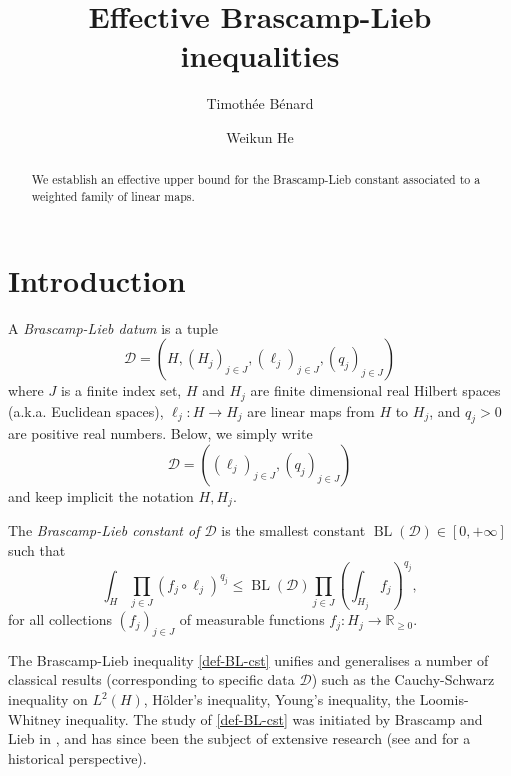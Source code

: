 \documentclass[a4paper,english]{amsart}
\author{Timoth\'ee B\'enard }
\author{Weikun He}
\title{Effective Brascamp-Lieb inequalities}
\theoremstyle{definition}
\newcommand{\R}{\mathbb{R}}
\newcommand{\1}{\mathbbm{1}}
\newcommand{\sD} {{\mathscr D}}
\DeclareMathOperator{\BL}{BL}
\begin{document}
\begin{abstract}
We establish an effective upper bound for the Brascamp-Lieb constant associated to a weighted family of linear maps.
\end{abstract}
\maketitle
\large

\setcounter{tocdepth}{2}    %
\tableofcontents

\section{Introduction} \label{Sec-intro}
A \emph{Brascamp-Lieb datum} is a tuple
$$\sD=(H, (H_{j})_{j\in J}, (\ell_j)_{j \in J}, (q_{j})_{j \in J}) $$
where $J$ is a finite index set, $H$ and $H_{j}$ are finite dimensional real Hilbert spaces (a.k.a. Euclidean spaces), $\ell_{j} : H \to H_{j}$ are
linear maps from $H$ to $H_{j}$, and $q_{j}>0$ are positive real numbers. Below, we simply write
$$\sD=((\ell_j)_{j \in J}, (q_{j})_{j \in J})$$
and keep implicit the notation $H,H_{j}$.


The \emph{Brascamp-Lieb constant of $\sD$} is the smallest constant $\BL(\sD)\in [0, +\infty]$ such that
\begin{equation}\label{def-BL-cst}
\int_{H} \prod_{j \in J} (f_{j}\circ \ell_{j})^{q_{j}} \leq \BL(\sD) \prod_{j \in J} \left(\int_{H_{j}} f_{j} \right)^{q_{j}},
\end{equation}
for all collections $(f_{j})_{j \in J}$ of measurable functions $f_j  \colon H_{j} \rightarrow \R_{\geq 0}$.

The Brascamp-Lieb inequality \eqref{def-BL-cst} unifies and generalises a number of classical results (corresponding to specific data $\sD$) such as the Cauchy-Schwarz inequality on $L^2(H)$, Hölder's inequality, Young's inequality,  the Loomis-Whitney inequality.
The study of \eqref{def-BL-cst} was initiated by Brascamp and Lieb in \cite{BL76}, and has since  been the subject of extensive research (see \cite{BCCT08} and \cite{Zhang_survey} for a historical perspective).
\end{document}
